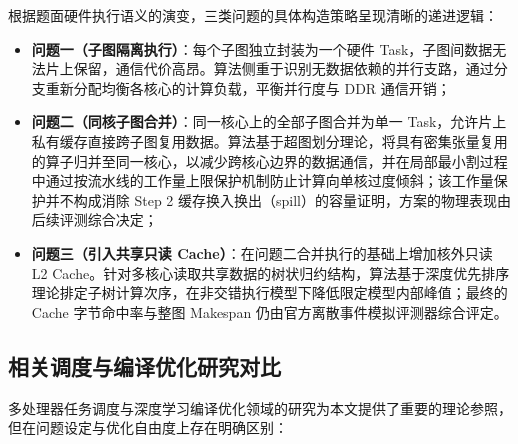 \documentclass[anonymous,withtoc]{gmcm2026}
\providecommand{\tightlist}{\setlength{\itemsep}{0pt}\setlength{\parskip}{0pt}}
\begin{document}
根据题面硬件执行语义的演变，三类问题的具体构造策略呈现清晰的递进逻辑：

\begin{itemize}
\tightlist
\item
  \textbf{问题一（子图隔离执行）}：每个子图独立封装为一个硬件 Task，子图间数据无法片上保留，通信代价高昂。算法侧重于识别无数据依赖的并行支路，通过分支重新分配均衡各核心的计算负载，平衡并行度与 DDR 通信开销；
\item
  \textbf{问题二（同核子图合并）}：同一核心上的全部子图合并为单一 Task，允许片上私有缓存直接跨子图复用数据。算法基于超图划分理论，将具有密集张量复用的算子归并至同一核心，以减少跨核心边界的数据通信，并在局部最小割过程中通过按流水线的工作量上限保护机制防止计算向单核过度倾斜；该工作量保护并不构成消除 Step 2 缓存换入换出（spill）的容量证明，方案的物理表现由后续评测综合决定；
\item
  \textbf{问题三（引入共享只读 Cache）}：在问题二合并执行的基础上增加核外只读 L2 Cache。针对多核心读取共享数据的树状归约结构，算法基于深度优先排序理论排定子树计算次序，在非交错执行模型下降低限定模型内部峰值；最终的 Cache 字节命中率与整图 Makespan 仍由官方离散事件模拟评测器综合评定。
\end{itemize}

\subsection{相关调度与编译优化研究对比}

多处理器任务调度与深度学习编译优化领域的研究为本文提供了重要的理论参照，但在问题设定与优化自由度上存在明确区别：
\end{document}
